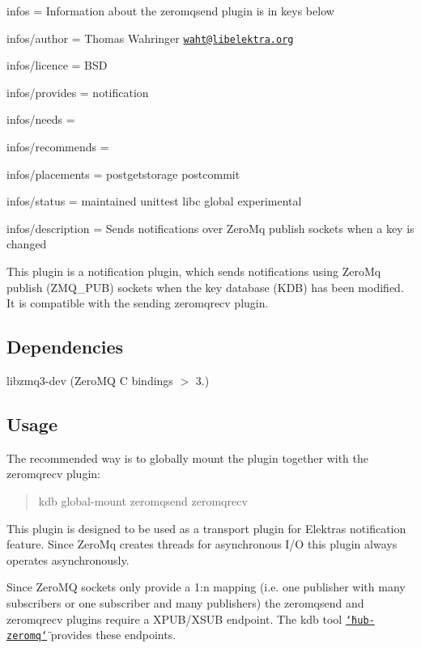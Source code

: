 
\begin{DoxyItemize}
\item infos = Information about the zeromqsend plugin is in keys below
\item infos/author = Thomas Wahringer \href{mailto:waht@libelektra.org}{\tt waht@libelektra.\+org}
\item infos/licence = B\+SD
\item infos/provides = notification
\item infos/needs =
\item infos/recommends =
\item infos/placements = postgetstorage postcommit
\item infos/status = maintained unittest libc global experimental
\item infos/description = Sends notifications over Zero\+Mq publish sockets when a key is changed
\end{DoxyItemize}

This plugin is a notification plugin, which sends notifications using Zero\+Mq publish ({\ttfamily Z\+M\+Q\+\_\+\+P\+UB}) sockets when the key database (K\+DB) has been modified. It is compatible with the sending zeromqrecv plugin.

\subsection*{Dependencies}


\begin{DoxyItemize}
\item {\ttfamily libzmq3-\/dev} (Zero\+MQ C bindings $>$ 3.)
\end{DoxyItemize}

\subsection*{Usage}

The recommended way is to globally mount the plugin together with the zeromqrecv plugin\+:

\begin{quote}
kdb global-\/mount zeromqsend zeromqrecv \end{quote}


This plugin is designed to be used as a transport plugin for Elektra\textquotesingle{}s notification feature. Since Zero\+Mq creates threads for asynchronous I/O this plugin always operates asynchronously.

Since Zero\+MQ sockets only provide a 1\+:n mapping (i.\+e. one publisher with many subscribers or one subscriber and many publishers) the {\ttfamily zeromqsend} and {\ttfamily zeromqrecv} plugins require a X\+P\+U\+B/\+X\+S\+UB endpoint. The kdb tool \href{https://www.libelektra.org/tools/hub-zeromq}{\tt \char`\"{}hub-\/zeromq\char`\"{}} provides these endpoints.

